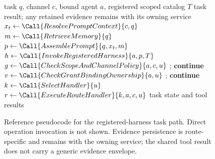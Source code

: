 \begin{figure}[!t]
\centering
\begin{algorithmic}[1]
\Require task $q$, channel $c$, bound agent $a$, registered scoped catalog $T$
\Ensure task result; any retained evidence remains with its owning service
\State $x_t \gets \Call{ResolvePromptContext}{c,q}$
\State $m \gets \Call{RetrieveMemory}{q}$
\State $p \gets \Call{AssemblePrompt}{q,x_t,m}$
\State $h \gets \Call{InvokeRegisteredHarness}{a,p,T}$
  \State $g \gets \Call{CheckScopeAndChannelPolicy}{a,c,u}$
    \State {}; \textbf{continue}
  \EndIf
    \State $v \gets \Call{CheckGrantBindingOwnership}{a,u}$
      \State {}; \textbf{continue}
    \EndIf
  \EndIf
  \State $k \gets \Call{SelectHandler}{u}$
  \State $r \gets \Call{ExecuteRouteHandler}{k,a,c,u}$
  \State {}
\EndFor
\State \Return task state and tool results
\end{algorithmic}
\caption{Reference pseudocode for the registered-harness task path.
Direct operation invocation is not shown. Evidence persistence is
route-specific and remains with the owning service; the shared tool result
does not carry a generic evidence envelope.}
\label{fig:execution}
\end{figure}
